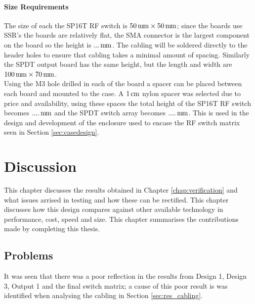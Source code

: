 \documentclass[12pt,openany,a4paper]{book}
\newcommand{\pack}	{\hspace{-0.08em}}
\newcommand{\cm}	{\ensuremath{\rm\,cm}}
\newcommand{\mm}	{\ensuremath{\rm\,m\pack m}}
\begin{document}
\subsubsection{Size Requirements}
The size of each the SP16T RF switch is $50\mm \times 50\mm$; since the boards use SSR's the boards are relatively flat, the SMA connector is the largest component on the board so the height is $...\mm$. The cabling will be soldered directly to the header holes to ensure that cabling takes a minimal amount of spacing. Similarly the SPDT output board has the same height, but the length and width are $100\mm \times 70\mm$. \\[0.2cm]
Using the M3 hole drilled in each of the board a spacer can be placed between each board and mounted to the case. A $1\cm$ nylon spacer was selected due to price and availability, using these spaces the total height of the SP16T RF switch becomes $....\mm$ and the SPDT switch array becomes $....\mm$. This is used in the design and development of the enclosure used to encase the RF switch matrix seen in Section \ref{sec:casedesign}.



















\chapter{Discussion}	\label{sec:discussion}
This chapter discusses the results obtained in Chapter \ref{chap:verification} and what issues arrised in testing and how these can be rectified. This chapter discusses how this design compares against other available technology in performance, cost, speed and size. This chapter summarises the contributions made by completing this thesis. 
\section{Problems}
It was seen that there was a poor reflection in the results from Design 1, Design 3, Output 1 and the final switch matrix; a cause of this poor result is was identified when analysing the cabling in Section \ref{sec:res_cabling}. 
\end{document}
